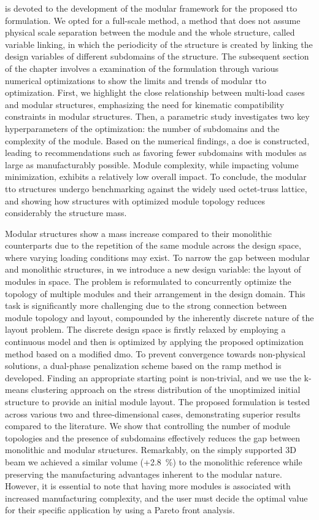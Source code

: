  is devoted to the development of the modular framework for the proposed \gls{tto} formulation. We opted for a full-scale method, a method that does not assume physical scale separation between the module and the whole structure, called variable linking, in which the periodicity of the structure is created by linking the design variables of different subdomains of the structure. The subsequent section of the chapter involves a examination of the formulation through various numerical optimizations to show the limits and trends of modular \gls{tto} optimization. First, we highlight the close relationship between multi-load cases and modular structures, emphasizing the need for kinematic compatibility constraints in modular structures. Then, a parametric study investigates two key hyperparameters of the optimization: the number of subdomains and the complexity of the module. Based on the numerical findings, a \gls{doe} is constructed, leading to recommendations such as favoring fewer subdomains with modules as large as manufacturably possible. Module complexity, while impacting volume minimization, exhibits a relatively low overall impact. To conclude, the modular \gls{tto} structures undergo benchmarking against the widely used octet-truss lattice, and showing how structures with optimized module topology reduces considerably the structure mass.

Modular structures show a mass increase compared to their monolithic counterparts due to the repetition of the same module across the design space, where varying loading conditions may exist. To narrow the gap between modular and monolithic structures, in  we introduce a new design variable: the layout of modules in space. The problem is reformulated to concurrently optimize the topology of multiple modules and their arrangement in the design domain. This task is significantly more challenging due to the strong connection between module topology and layout, compounded by the inherently discrete nature of the layout problem. The discrete design space is firstly relaxed by employing a continuous model and then is optimized by applying the proposed optimization method based on a modified \gls{dmo}. To prevent convergence towards non-physical solutions, a dual-phase penalization scheme based on the \gls{ramp} method is developed. Finding an appropriate starting point is non-trivial, and we use the k-means clustering approach on the stress distribution of the unoptimized initial structure to provide an initial module layout. The proposed formulation is tested across various two and three-dimensional cases, demonstrating superior results compared to the literature. We show that controlling the number of module topologies and the presence of subdomains effectively reduces the gap between monolithic and modular structures. Remarkably, on the simply supported 3D beam we achieved a similar volume (+\qty{2.8}{\percent}) to the monolithic reference while preserving the manufacturing advantages inherent to the modular nature. However, it is essential to note that having more modules is associated with increased manufacturing complexity, and the user must decide the optimal value for their specific application by using a Pareto front analysis.

